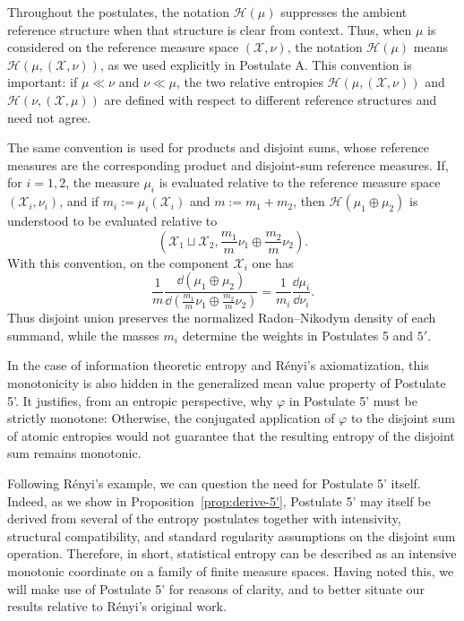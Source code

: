 \documentclass[reqno]{amsart}
\begin{document}
\begin{remark}
\label{rem:ent-notation}
Throughout the postulates, the notation $\mathcal{H}(\mu)$ suppresses the ambient
reference structure when that structure is clear from context. Thus, when
$\mu$ is considered on the reference measure space
$(\mathcal{X},\nu)$, the notation $\mathcal{H}(\mu)$ means
$\mathcal{H}(\mu,(\mathcal{X},\nu))$, as we used explicitly in Postulate A.
This convention is important: if $\mu\ll\nu$ and $\nu\ll\mu$, the two relative entropies $\mathcal{H}(\mu,(\mathcal{X},\nu))$ and $\mathcal{H}(\nu,(\mathcal{X},\mu))$ are defined with respect to different reference structures and need not agree.

The same convention is used for products and disjoint sums, whose reference measures are the corresponding product and disjoint-sum reference measures. 
If, for $i=1,2$, the measure $\mu_i$ is evaluated relative to the reference
measure space $(\mathcal{X}_i,\nu_i)$, and if $m_i:=\mu_i(\mathcal{X}_i)$ and $m:=m_1+m_2$,
then $\mathcal{H}(\mu_1\oplus\mu_2)$ is understood to be evaluated relative to
$$
\left(
\mathcal{X}_1\sqcup\mathcal{X}_2,
\frac{m_1}{m}\nu_1\oplus\frac{m_2}{m}\nu_2
\right).
$$
With this convention, on the component $\mathcal{X}_i$ one has
$$
\frac{1}{m}
\frac{\dd(\mu_1\oplus\mu_2)}
{\dd\left(\frac{m_1}{m}\nu_1\oplus\frac{m_2}{m}\nu_2\right)}
=
\frac{1}{m_i}\frac{\dd\mu_i}{\dd\nu_i}.
$$
Thus disjoint union preserves the normalized Radon--Nikodym density of each
summand, while the masses $m_i$ determine the weights in Postulates 5 and $5'$.
\end{remark}
In the case of information theoretic entropy and Rényi's axiomatization, this monotonicity is also hidden in the generalized mean value property of Postulate 5'. It justifies, from an entropic perspective,  why $\varphi$ in Postulate 5' must be strictly monotone: Otherwise, the conjugated application of $\varphi$ to the disjoint sum of atomic entropies would not guarantee that the resulting entropy of the disjoint sum remains monotonic.  

\begin{remark}
\label{rem:post5'}
Following R\'enyi's example, we can question the need for Postulate 5' itself. Indeed, as we show in Proposition~\ref{prop:derive-5'}, Postulate 5' may itself be derived from several of the entropy postulates together with intensivity, structural compatibility, and standard regularity assumptions on the disjoint sum operation.
Therefore, in short, statistical entropy can be described as an intensive monotonic coordinate on a family of finite measure spaces.
Having noted this, we will make use of Postulate 5' for reasons of clarity, and to better situate our results relative to R\'enyi's original work.
\end{remark}
\end{document}
